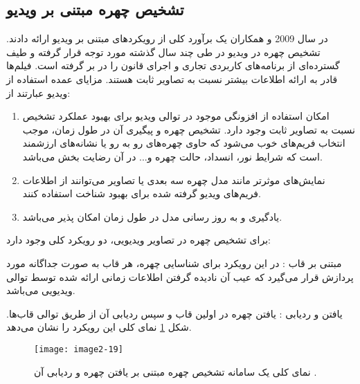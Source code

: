 \subsection{تشخیص چهره مبتنی بر ویدیو}
در سال 2009  و همکاران \cite{wang2009video} یک برآورد کلی از رویکردهای مبتنی بر ویدیو ارائه دادند. تشخیص چهره در ویدیو در طی چند سال گذشته مورد توجه قرار گرفته و طیف گسترده‌ای از برنامه‌های کاربردی تجاری و اجرای قانون را در بر گرفته است. فیلم‌ها قادر به ارائه اطلاعات بیشتر نسبت به تصاویر ثابت هستند. مزایای عمده استفاده از ویدیو عبارتند از:

\begin{enumerate}
\item
	امکان استفاده از افزونگی موجود در توالی ویدیو برای بهبود عملکرد تشخیص نسبت به تصاویر ثابت وجود دارد. تشخیص چهره و پیگیری آن در طول زمان، موجب انتخاب فریم‌های خوب می‌شود که حاوی چهره‌های رو به رو یا نشانه‌های ارزشمند است که شرایط نور، انسداد، حالت چهره و... در آن رضایت بخش می‌باشد.

\item
	نمایش‌های موثرتر مانند مدل چهره سه بعدی یا تصاویر  می‌توانند از اطلاعات فریم‌های ویدیو گرفته شده برای بهبود شناخت استفاده کنند.

\item
	یادگیری و به روز رسانی مدل در طول زمان امکان پذیر می‌باشد.
\end{enumerate}
	
\noindent
برای تشخیص چهره در تصاویر ویدیویی، دو رویکرد کلی وجود دارد:

\noindent
مبتنی بر قاب : در این رویکرد برای شناسایی چهره، هر قاب به صورت جداگانه مورد پردازش قرار می‌گیرد که عیب آن نادیده گرفتن اطلاعات زمانی ارائه شده توسط توالی ویدیویی می‌باشد. 

\noindent
یافتن و ردیابی : یافتن چهره در اولین قاب و سپس ردیابی آن از طریق توالی قاب‌ها. شکل \ref{image2-19} نمای کلی این رویکرد را نشان می‌دهد.
 
 \begin{figure}[h]
\centering
  \texttt{[image: image2-19]}
  \caption{نمای کلی یک سامانه تشخیص چهره مبتنی بر یافتن چهره و ردیابی آن \cite{wang2009video}.}
  \label{image2-19}
\end{figure}


